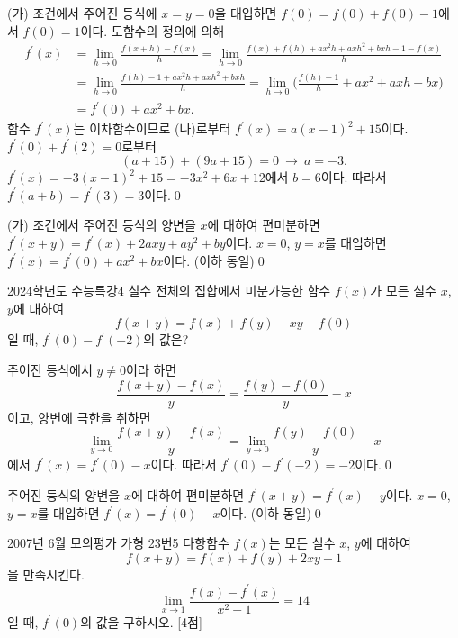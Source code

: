 \documentclass{article}
\begin{document}
\begin{sol}[정석 풀이]
	(가) 조건에서 주어진 등식에 $x=y=0$을 대입하면 $f(0)=f(0)+f(0)-1$에서 $f(0)=1$이다. 도함수의 정의에 의해
	\begin{align*}
		f^\prime(x)&=\lim\limits_{h\to0}\frac{f(x+h)-f(x)}{h}=\lim\limits_{h\to0}\frac{f(x)+f(h)+ax^2h+axh^2+bxh-1-f(x)}{h}\\[3pt]
		&=\lim\limits_{h\to0}\frac{f(h)-1+ax^2h+axh^2+bxh}{h}=\lim\limits_{h\to0}\biggl(\frac{f(h)-1}{h}+ax^2+axh+bx\biggr)\\[3pt]
		&=f^\prime(0)+ax^2+bx.
	\end{align*}
	함수 $f^\prime(x)$는 이차함수이므로 (나)로부터 $f^\prime(x)=a(x-1)^2+15$이다. $f^\prime(0)+f^\prime(2)=0$로부터
	\[
		(a+15)+(9a+15)=0~\longrightarrow~a=-3.
	\]
	$f^\prime(x)=-3(x-1)^2+15=-3x^2+6x+12$에서 $b=6$이다. 따라서 $f^\prime(a+b)=f^\prime(3)=3$이다.\qed
\end{sol}

\begin{sol}[편미분 풀이]
	(가) 조건에서 주어진 등식의 양변을 $x$에 대하여 편미분하면 $f^\prime(x+y)=f^\prime(x)+2axy+ay^2+by$이다. $x=0$, $y=x$를 대입하면 $f^\prime(x)=f^\prime(0)+ax^2+bx$이다. (이하 동일)\qed
\end{sol}

\newpage
\begin{prob}{2024학년도 수능특강}{4}
	실수 전체의 집합에서 미분가능한 함수 $f(x)$가 모든 실수 $x$, $y$에 대하여
	\[
		f(x+y)=f(x)+f(y)-xy-f(0)
	\]
	일 때, $f^\prime(0)-f^\prime(-2)$의 값은?
\end{prob}

\begin{sol}[정석 풀이]
	주어진 등식에서 $y\ne0$이라 하면
	\[
		\frac{f(x+y)-f(x)}{y}=\frac{f(y)-f(0)}{y}-x
	\]
	이고, 양변에 극한을 취하면
	\[
		\lim\limits_{y\to0}\frac{f(x+y)-f(x)}{y}=\lim\limits_{y\to0}\frac{f(y)-f(0)}{y}-x
	\]
	에서 $f^\prime(x)=f^\prime(0)-x$이다. 따라서 $f^\prime(0)-f^\prime(-2)=-2$이다.\qed
\end{sol}

\begin{sol}[편미분 풀이]
	주어진 등식의 양변을 $x$에 대하여 편미분하면 $f^\prime(x+y)=f^\prime(x)-y$이다. $x=0$, $y=x$를 대입하면 $f^\prime(x)=f^\prime(0)-x$이다. (이하 동일)\qed
\end{sol}

\newpage
\begin{prob}{2007년 6월 모의평가 가형 23번}{5}
	다항함수 $f(x)$는 모든 실수 $x$, $y$에 대하여
	\[
		f(x+y)=f(x)+f(y)+2xy-1
	\]
	을 만족시킨다.
	\[
		\lim\limits_{x\to1}\frac{f(x)-f^\prime(x)}{x^2-1}=14
	\]
	일 때, $f^\prime(0)$의 값을 구하시오. [4점]
\end{prob}
\end{document}

